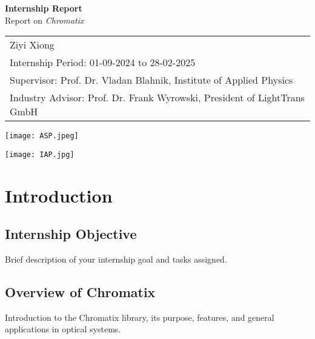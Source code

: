 \documentclass[a4paper,12pt]{report}
\begin{document}
\begin{titlepage}
    \centering
    \vspace*{1cm}
    {\Huge\bfseries Internship Report\\[0.5cm]}
    \vspace{1cm}
    {\LARGE Report on \textit{Chromatix}}\\[2cm]

    \begin{tabularx}{\textwidth}{X}
    \centering \large Ziyi Xiong\\[0.5cm]
    \centering \large Internship Period: 01-09-2024 to 28-02-2025\\[0.5cm]
    \centering \large Supervisor: Prof. Dr. Vladan Blahnik, Institute of Applied Physics\\[0.5cm]
    \centering \large Industry Advisor: Prof. Dr. Frank Wyrowski, President of LightTrans GmbH\\
    \end{tabularx}

    \vfill

    \begin{minipage}[b]{0.45\textwidth}
        \centering
        \texttt{[image: ASP.jpeg]}
    \end{minipage}
    \hfill
    \begin{minipage}[b]{0.45\textwidth}
        \centering
        \texttt{[image: IAP.jpg]}
    \end{minipage}

    \vspace{2cm}
\end{titlepage}

\tableofcontents
\newpage

\chapter{Introduction}
\section{Internship Objective}
Brief description of your internship goal and tasks assigned.

\section{Overview of Chromatix}
Introduction to the Chromatix library, its purpose, features, and general applications in optical systems.
\end{document}

